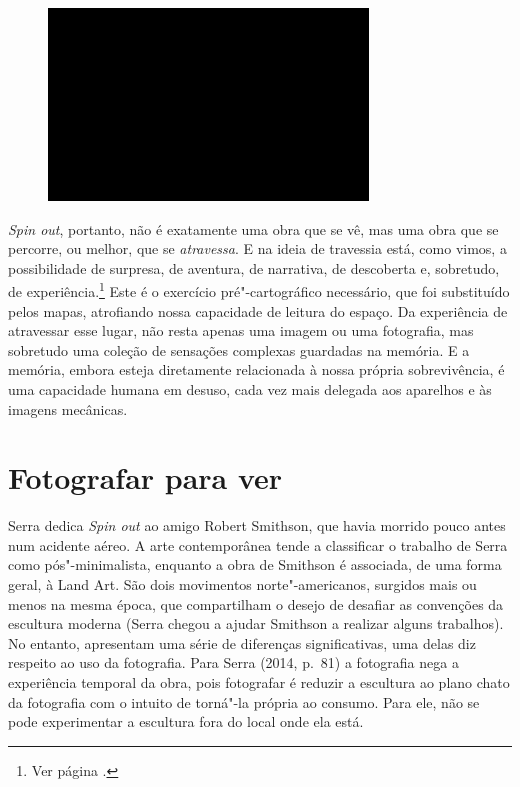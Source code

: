 \begin{figure}[!ht]

\centering
 \includegraphics[width=85mm]{./imgs/im1.jpg}
\caption{\tiny{}}

\end{figure}

\emph{Spin out}, portanto, não é exatamente uma obra que se vê, mas uma
obra que se percorre, ou melhor, que se \emph{atravessa}. E na ideia de
travessia está, como vimos, a possibilidade de surpresa, de aventura, de
narrativa, de descoberta e, sobretudo, de experiência.\footnote{Ver página \pageref{travessia}.} Este é o
exercício pré"-cartográfico necessário, que foi substituído pelos mapas,
atrofiando nossa capacidade de leitura do espaço. Da experiência de
atravessar esse lugar, não resta apenas uma imagem ou uma fotografia,
mas sobretudo uma coleção de sensações complexas guardadas na memória. E
a memória, embora esteja diretamente relacionada à nossa própria
sobrevivência, é uma capacidade humana em desuso, cada vez mais delegada
aos aparelhos e às imagens mecânicas.

\chapter{Fotografar para ver}

Serra dedica \emph{Spin out} ao amigo Robert Smithson, que havia morrido
pouco antes num acidente aéreo. A arte contemporânea tende a classificar
o trabalho de Serra como pós"-minimalista, enquanto a obra de Smithson é
associada, de uma forma geral, à Land Art. São dois movimentos
norte"-americanos, surgidos mais ou menos na mesma época, que
compartilham o desejo de desafiar as convenções da escultura moderna
(Serra chegou a ajudar Smithson a realizar alguns trabalhos). No
entanto, apresentam uma série de diferenças significativas, uma delas
diz respeito ao uso da fotografia. Para Serra (2014, p.~81) a fotografia
nega a experiência temporal da obra, pois fotografar é reduzir a
escultura ao plano chato da fotografia com o intuito de torná"-la própria
ao consumo. Para ele, não se pode experimentar a escultura fora do local
onde ela está.

